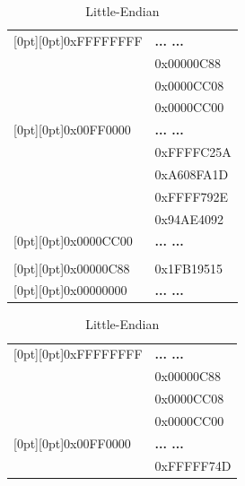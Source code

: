 \documentclass[addpoints, 12pt, answers]{exam}
\begin{document}
\begin{questions}
\begin{parts}
\begin{table}[h]
\vspace{1em}
\renewcommand{\arraystretch}{1.5}
\begin{minipage}[t]{0.5\textwidth}
\centering
\begin{tabular}{l|l|}
\cline{2-2}
\raisebox{2ex}[0pt][0pt]{0xFFFFFFFF}  &{\bf... ...}\\ \cline{2-2}
                                      & 0x00000C88 \\ \cline{2-2}
                                      & 0x0000CC08 \\ \cline{2-2}
                                      & 0x0000CC00 \\ \cline{2-2}
\raisebox{2ex}[0pt][0pt]{0x00FF0000}  &{\bf... ...}\\ \cline{2-2}
                                      & 0xFFFFC25A \\ \cline{2-2}
                                      & 0xA608FA1D \\ \cline{2-2}
                                      & 0xFFFF792E \\ \cline{2-2}
                                      & 0x94AE4092 \\ \cline{2-2}
\raisebox{2ex}[0pt][0pt]{0x0000CC00}  &{\bf... ...}\\ \cline{2-2}
                                      &            \\ \cline{2-2}
\raisebox{-2ex}[0pt][0pt]{0x00000C88} & 0x1FB19515 \\ \cline{2-2}
\raisebox{-2ex}[0pt][0pt]{0x00000000} &{\bf... ...}\\ \cline{2-2}
\end{tabular}
\caption*{Little-Endian}
\end{minipage}
\hfill
\begin{minipage}[t]{0.5\textwidth}
\centering
\begin{tabular}{l|l|}
\cline{2-2}
\raisebox{2ex}[0pt][0pt]{0xFFFFFFFF}  &{\bf... ...}\\ \cline{2-2}
                                      & 0x00000C88 \\ \cline{2-2}
                                      & 0x0000CC08 \\ \cline{2-2}
                                      & 0x0000CC00 \\ \cline{2-2}
\raisebox{2ex}[0pt][0pt]{0x00FF0000}  &{\bf... ...}\\ \cline{2-2}
                                      & 0xFFFFF74D \\ \cline{2-2}

\end{tabular}
\end{minipage}
\end{table}
\end{parts}
\end{questions}
\end{document}
